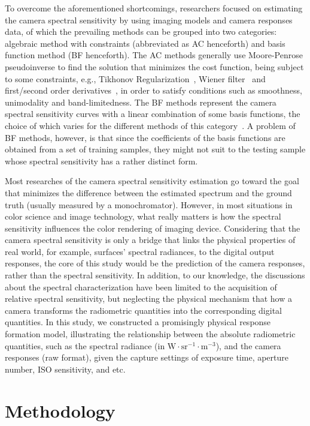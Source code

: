 \documentclass[9pt,twocolumn,twoside]{osajnl}
\begin{document}
	To overcome the aforementioned shortcomings, researchers focused on estimating the camera spectral sensitivity by using imaging models and camera responses data, of which the prevailing methods can be grouped into two categories: algebraic method with constraints (abbreviated as AC henceforth) and basis function method (BF henceforth). The AC methods generally use Moore-Penrose pseudoinverse to find the solution that minimizes the cost function, being subject to some constraints, e.g., Tikhonov Regularization~\cite{Dyas:00}, Wiener filter~\cite{Urban:10} and first/second order derivatives~\cite{Barnard:02}, in order to satisfy conditions such as smoothness, unimodality and band-limitedness. The BF methods represent the camera spectral sensitivity curves with a linear combination of some basis functions, the choice of which varies for the different methods of this category~\cite{Finlayson:98,Zhao:09,Jiang:13}. A problem of BF methods, however, is that since the coefficients of the basis functions are obtained from a set of training samples, they might not suit to the testing sample whose spectral sensitivity has a rather distinct form.
	
	Most researches of the camera spectral sensitivity estimation go toward the goal that minimizes the difference between the estimated spectrum and the ground truth (usually measured by a monochromator). However, in most situations in color science and image technology, what really matters is how the spectral sensitivity influences the color rendering of imaging device. Considering that the camera spectral sensitivity is only a bridge that links the physical properties of real world, for example, surfaces' spectral radiances, to the digital output responses, the core of this study would be the prediction of the camera responses, rather than the spectral sensitivity. In addition, to our knowledge, the discussions about the spectral characterization have been limited to the acquisition of relative spectral sensitivity, but neglecting the physical mechanism that how a camera transforms the radiometric quantities into the corresponding digital quantities. In this study, we constructed a promisingly physical response formation model, illustrating the relationship between the absolute radiometric quantities, such as the spectral radiance (in $\text{W}\cdot\text{sr}^{-1}\cdot\text{m}^{-3}$), and the camera responses (raw format), given the capture settings of exposure time, aperture number, ISO sensitivity, and etc.
	
	\section{Methodology}\label{sec:methodology}
	
\end{document}

